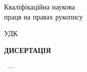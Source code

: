 \thispagestyle{empty}%
\begin{center}%
\thesisOrganization

\thesisMON

\thesisOrganization

\thesisMON

\end{center}%

\vspace{0pt plus4fill} %
\begin{flushright}%
  \begin{minipage}[b]{0.4\linewidth}
    \begin{flushleft}%
Кваліфікаційна наукова \\
праця на правах рукопису
    \end{flushleft}%
  \end{minipage}
\end{flushright}%

\vspace{0pt plus2fill} %
\begin{center}%
{\textbf{\MakeUppercase{\thesisAuthor}} }
\end{center}%

\vspace{0pt plus0.5fill} %
\begin{flushright}%
  \begin{minipage}[b]{0.45\linewidth}
    \begin{flushleft}%
       УДК \thesisUdk
    \end{flushleft}%
  \end{minipage}
\end{flushright}%

\vspace{0pt plus1fill} %
\begin{center}%
{\textbf{ДИСЕРТАЦІЯ} }
\end{center}%
%

\vspace{0pt plus1fill} %
\begin{center}%
\MakeUppercase{
\thesisTitle}

\vspace{0pt plus4fill} %
{%
\thesisSpecialtyNumber~---~
\thesisSpecialtyTitle
%
}
\end{center}%

